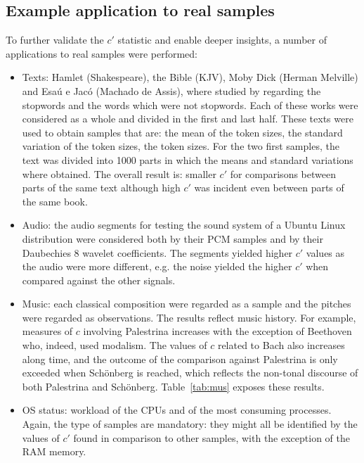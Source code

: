 \documentclass[12pt,fleqn]{article}
\begin{document}
\subsection{Example application to real samples}
To further validate the $c'$ statistic and enable deeper insights,
a number of applications to real samples were performed:
\begin{itemize}
	\item Texts: Hamlet (Shakespeare), the Bible (KJV), Moby Dick (Herman Melville) and Esaú e Jacó (Machado de Assis),
		where studied by regarding the stopwords and the words which were not stopwords.
		Each of these works were considered as a whole and divided in the first and last half.
                These texts were used to obtain samples that are:
		the mean of the token sizes, the standard variation of the token sizes,
		the token sizes.
		For the two first samples, the text was divided into 1000 parts in which the means
		and standard variations where obtained.
		The overall result is: smaller $c'$ for comparisons between parts of the same text
		although high $c'$ was incident even between parts of the same book.
	\item Audio: the audio segments for testing the sound system of a Ubuntu Linux distribution
		were considered both by their PCM samples and by their Daubechies 8 wavelet coefficients.
		The segments yielded higher $c'$ values as the audio were more different, e.g. the noise
		yielded the higher $c'$ when compared against the other signals.
	\item Music: each classical composition were regarded as a sample
		and the pitches were regarded as observations.
		The results reflect music history.
		For example, measures of $c$ involving Palestrina
		increases with the exception of Beethoven
		who, indeed, used modalism.
		The values of $c$ related to Bach also increases along time,
		and the outcome of the comparison against Palestrina 
		is only exceeded when Sch\"onberg is reached,
		which reflects the non-tonal discourse of both
		Palestrina and Sch\"onberg.
		Table~\ref{tab:mus} exposes these results.
	\item OS status: workload of the CPUs and of the most consuming processes.
		Again, the type of samples are mandatory:
		they might all be identified by the values of $c'$
		found in comparison to other samples,
		with the exception of the RAM memory.
\end{itemize}


\end{document}
